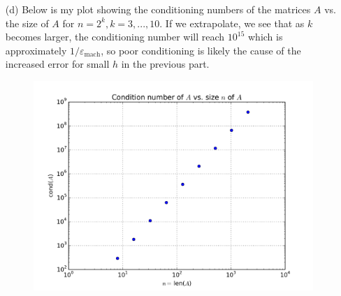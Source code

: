 \documentclass[10pt]{article}
\newcommand{\eps}{\varepsilon}
\begin{document}
\begin{itemize}
\item[(d)] Below is my plot showing the conditioning numbers of the matrices $A$ vs. the size of $A$ for $ n = 2^k, k = 3, ... , 10 $. If we extrapolate, we see that as $k$ becomes larger, the conditioning number will reach $ 10^{15} $ which is approximately $1/ \eps_{\text{mach}}$, so poor conditioning is likely the cause of the increased error for small $h$ in the previous part.

\begin{figure}[H]
  \centering
    \includegraphics[scale=0.6]{conds}
\end{figure}

\end{itemize}

\newpage

\end{document}
